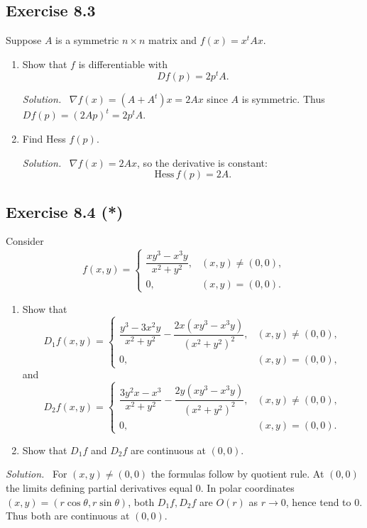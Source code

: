 \documentclass[11pt,a4paper]{article}
\newenvironment{solution}{\par\noindent\textit{Solution.}\ }{\par\vspace{0.5em}}
\begin{document}
\subsection*{Exercise 8.3}
Suppose $A$ is a symmetric $n\times n$ matrix and $f(x)=x^tAx$.

\begin{enumerate}[label=\alph*)]
	\item Show that $f$ is differentiable with
	\[
	Df(p)=2p^tA.
	\]
	
	\begin{solution}
		$\nabla f(x)=(A+A^t)x=2Ax$ since $A$ is symmetric.  
		Thus $Df(p)=(2Ap)^t=2p^tA$.
	\end{solution}
	
	\item Find Hess $f(p)$.
	
	\begin{solution}
		$\nabla f(x)=2Ax$, so the derivative is constant:
		\[
		\mathrm{Hess}\,f(p)=2A.
		\]
	\end{solution}
\end{enumerate}


\subsection*{Exercise 8.4 (*)}
Consider
\[
f(x,y)=
\begin{cases}
	\dfrac{xy^3-x^3y}{x^2+y^2}, & (x,y)\neq (0,0),\\
	0, & (x,y)=(0,0).
\end{cases}
\]

\begin{enumerate}[label=\alph*)]
	\item Show that
	\[
	D_1f(x,y)=
	\begin{cases}
		\dfrac{y^3-3x^2y}{x^2+y^2}-\dfrac{2x(xy^3-x^3y)}{(x^2+y^2)^2}, & (x,y)\neq (0,0),\\
		0, & (x,y)=(0,0),
	\end{cases}
	\]
	and
	\[
	D_2f(x,y)=
	\begin{cases}
		\dfrac{3y^2x-x^3}{x^2+y^2}-\dfrac{2y(xy^3-x^3y)}{(x^2+y^2)^2}, & (x,y)\neq (0,0),\\
		0, & (x,y)=(0,0).
	\end{cases}
	\]
	
	\item Show that $D_1f$ and $D_2f$ are continuous at $(0,0)$.
\end{enumerate}

\begin{solution}
	For $(x,y)\neq (0,0)$ the formulas follow by quotient rule.  
	At $(0,0)$ the limits defining partial derivatives equal $0$.  
	In polar coordinates $(x,y)=(r\cos\theta,r\sin\theta)$, both $D_1f,D_2f$ are $O(r)$ as $r\to 0$, hence tend to $0$.  
	Thus both are continuous at $(0,0)$.
\end{solution}
\end{document}
